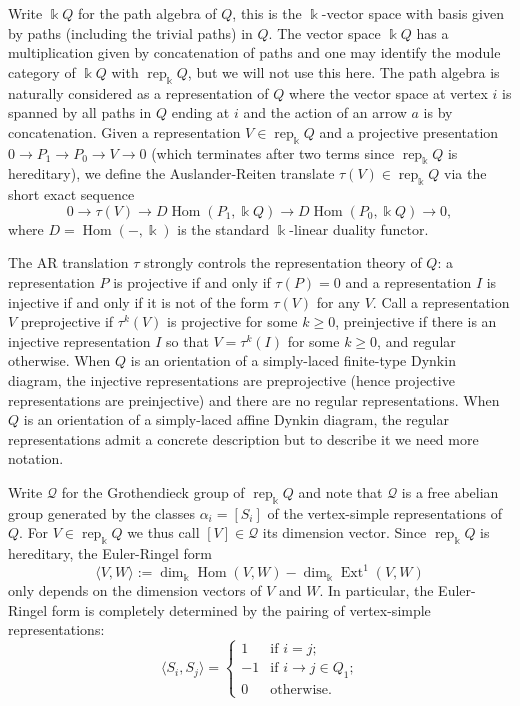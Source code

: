 \documentclass[12pt]{amsart}
\newcommand{\sayDR}[1]{\say[DR]{\color{red}{\bf DR:}\;#1}}
\newcommand{\kk}{\Bbbk}%
\newcommand{\cQ}{\mathcal{Q}}
\newcommand{\rep}{\operatorname{rep}}
\DeclareMathOperator{\Ext}{Ext}
\DeclareMathOperator{\Hom}{Hom}
\theoremstyle{remark}
\numberwithin{equation}{section}
\begin{document}
  Write $\kk Q$ for the path algebra of $Q$, this is the $\kk$-vector space with basis given by paths (including the trivial paths) in $Q$.  
  The vector space $\kk Q$ has a multiplication given by concatenation of paths and one may identify the module category of $\kk Q$ with $\rep_\kk Q$, but we will not use this here.  
  The path algebra is naturally considered as a representation of $Q$ where the vector space at vertex $i$ is spanned by all paths in $Q$ ending at $i$ and the action of an arrow $a$ is by concatenation.  
  Given a representation $V\in\rep_\kk Q$ and a projective presentation $0\to P_1\to P_0\to V\to 0$ (which terminates after two terms since $\rep_\kk Q$ is hereditary), we define the Auslander-Reiten translate $\tau(V)\in\rep_\kk Q$ via the short exact sequence
  \begin{equation}\label{eq:AR translation}
    0\longrightarrow \tau(V)\longrightarrow D\Hom(P_1,\kk Q)\longrightarrow D\Hom(P_0,\kk Q)\longrightarrow 0,
  \end{equation}
  where $D=\Hom(-,\kk)$ is the standard $\kk$-linear duality functor.

  The AR translation $\tau$ strongly controls the representation theory of $Q$: a representation $P$ is projective if and only if $\tau(P)=0$ and a representation $I$ is injective if and only if it is not of the form $\tau(V)$ for any $V$.  
  Call a representation $V$ preprojective if $\tau^k(V)$ is projective for some $k\ge0$, preinjective\sayDR{post?} if there is an injective representation $I$ so that $V=\tau^k(I)$ for some $k\ge0$, and regular otherwise.  
  When $Q$ is an orientation of a simply-laced finite-type Dynkin diagram, the injective representations are preprojective (hence projective representations are preinjective) and there are no regular representations.  
  When $Q$ is an orientation of a simply-laced affine Dynkin diagram, the regular representations admit a concrete description but to describe it we need more notation.

  Write $\cQ$ for the Grothendieck group of $\rep_\kk Q$ and note that $\cQ$ is a free abelian group generated by the classes $\alpha_i=[S_i]$ of the vertex-simple representations of $Q$.  
  For $V\in\rep_\kk Q$ we thus call $[V]\in\cQ$ its dimension vector.  
  Since $\rep_\kk Q$ is hereditary, the Euler-Ringel form \[\langle V,W\rangle:=\dim_\kk\Hom(V,W)-\dim_\kk\Ext^1(V,W)\] only depends on the dimension vectors of $V$ and $W$.  
  In particular, the Euler-Ringel form is completely determined by the pairing of vertex-simple representations:
  \[\langle S_i,S_j\rangle=\begin{cases}1 & \text{if $i=j$;}\\ -1 & \text{if $i\to j\in Q_1$;}\\ 0 & \text{otherwise.}\end{cases}\]
\end{document}
